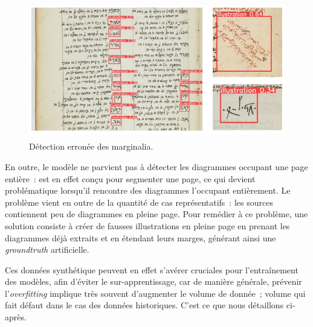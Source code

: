           \begin{figure}[H]
          \begin{center}
          \includegraphics[height=6cm]{figues/marginalia.png}
          \end{center}
          \caption{Détection erronée des marginalia.}
          \label{fig:marginalia} \end{figure}

En outre, le modèle ne parvient pas à détecter les diagrammes occupant
une page entière~: \yolo est en effet conçu pour segmenter une page, ce
qui devient problématique lorsqu'il rencontre des diagrammes l'occupant
entièrement. Le problème vient en outre de la quantité de cas
représentatifs~: les sources contiennent peu de diagrammes en pleine
page. Pour remédier à ce problème, une solution consiste à créer de
fausses illustrations en pleine page en prenant les diagrammes déjà
extraits et en étendant leurs marges, générant ainsi une \textit{groundtruth}
artificielle.

Ces données synthétique peuvent en effet s'avérer cruciales pour
l'entraînement des modèles, afin d'éviter le sur-apprentissage, car de
manière générale, prévenir l'\textit{overfitting} implique très souvent
d'augmenter le volume de donnée~; volume qui fait défaut dans le cas des
données historiques. C'est ce que nous détaillons ci-après.
